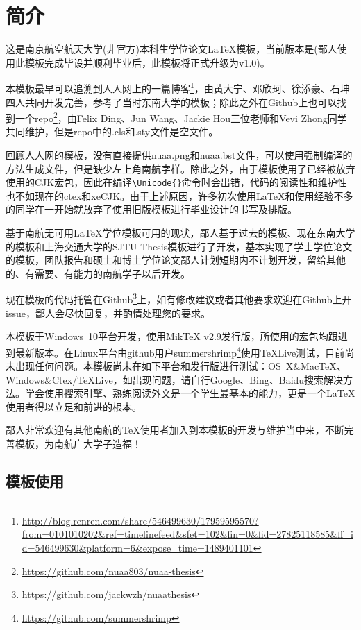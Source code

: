 \chapter{简介}\label{chap:intro}

这是南京航空航天大学(非官方)本科生学位论文\LaTeX 模板，当前版本是\version(鄙人使用此模板完成毕设并顺利毕业后，此模板将正式升级为v1.0)。

本模板最早可以追溯到人人网上的一篇博客\footnote{\url{http://blog.renren.com/share/546499630/17959595570?from=0101010202\&ref=timelinefeed\&sfet=102\&fin=0\&fid=27825118585\&ff\_id=546499630\&platform=6\&expose\_time=1489401101}}，由黄大宁、邓欣珂、徐添豪、石坤四人共同开发完善，参考了当时东南大学的\seuthesix 模板；除此之外在Github上也可以找到一个repo\footnote{\url{https://github.com/nuaa803/nuaa-thesis}}，由Felix Ding、Jun Wang、Jackie Hou三位老师和Vevi Zhong同学共同维护，但是repo中的.cls和.sty文件是空文件。

回顾人人网的模板，没有直接提供nuaa.png和nuaa.bst文件，可以使用强制编译的方法生成文件，但是缺少左上角南航字样。除此之外，由于模板使用了已经被放弃使用的CJK宏包，因此在编译\verb+\Unicode{}+命令时会出错，代码的阅读性和维护性也不如现在的ctex和xeCJK。由于上述原因，许多初次使用\LaTeX 和使用经验不多的同学在一开始就放弃了使用旧版模板进行毕业设计的书写及排版。

基于南航无可用\LaTeX 学位模板可用的现状，鄙人基于过去的\oldnuaathesis 模板、现在东南大学的\seuthesix 模板和上海交通大学的SJTU Thesis模板进行了开发，基本实现了学士学位论文的模板，团队报告和硕士和博士学位论文鄙人计划短期内不计划开发，留给其他的、有需要、有能力的南航学子以后开发。

现在\nuaathesis 模板的代码托管在Github\footnote{\url{https://github.com/jackwzh/nuaathesis}}上，如有修改建议或者其他要求欢迎在Github上开issue，鄙人会尽快回复，并酌情处理您的要求。

本模板于Windows~10平台开发，使用MikTeX v2.9发行版，所使用的宏包均跟进到最新版本。在Linux平台由github用户summershrimp\footnote{\url{https://github.com/summershrimp}}使用TeXLive测试，目前尚未出现任何问题。本模板尚未在如下平台和发行版进行测试：OS~X\&MacTeX、Windows\&Ctex/TeXLive，如出现问题，请自行Google、Bing、Baidu搜索解决方法。学会使用搜索引擎、熟练阅读外文是一个学生最基本的能力，更是一个\LaTeX 使用者得以立足和前进的根本。

鄙人非常欢迎有其他南航的\TeX 使用者加入到本模板的开发与维护当中来，不断完善模板，为南航广大学子造福！

\section{模板使用}
